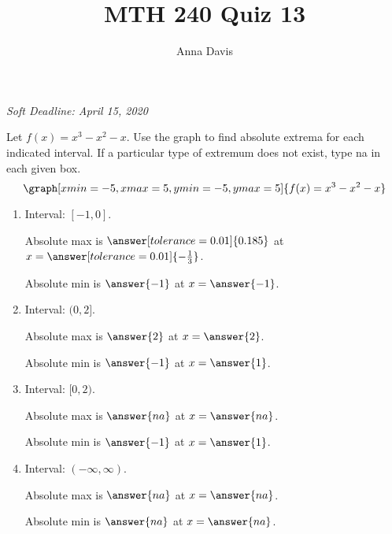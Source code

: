 \documentclass{ximera}
\author{Anna Davis} \title{MTH 240 Quiz 13}
\begin{document}
\begin{abstract}

\end{abstract}
\maketitle
 \textit{Soft Deadline: April 15, 2020}
\begin{problem}\label{prob:240quiz13prob1}
Let $f(x)=x^3-x^2-x$.  Use the graph to find absolute extrema for each indicated interval.  If a particular type of extremum does not exist, type na in each given box.
\[
\graph[xmin=-5,xmax=5,ymin=-5,ymax=5]{f(x)=x^3-x^2-x} 
\]

\begin{enumerate}
    \item Interval: $[-1, 0]$.
    
    Absolute max is $\answer[tolerance=0.01]{0.185}$ at $x=\answer[tolerance=0.01]{-\frac{1}{3}}$.
    
    Absolute min is $\answer{-1}$ at $x=\answer{-1}$.
    
    \item Interval: $(0, 2]$.
    
    Absolute max is $\answer{2}$ at $x=\answer{2}$.
    
    Absolute min is $\answer{-1}$ at $x=\answer{1}$.
    
    \item Interval: $[0, 2)$.
    
    Absolute max is $\answer{na}$ at $x=\answer{na}$.
    
    Absolute min is $\answer{-1}$ at $x=\answer{1}$.
    
    \item Interval: $(-\infty, \infty)$.
    
    Absolute max is $\answer{na}$ at $x=\answer{na}$.
    
    Absolute min is $\answer{na}$ at $x=\answer{na}$.
\end{enumerate}
\end{problem}
\end{document}
